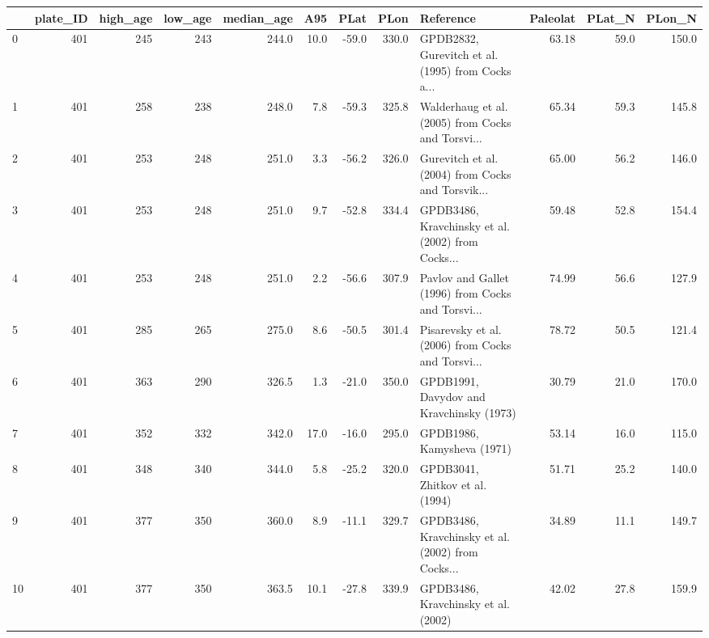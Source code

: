 \documentclass[11pt]{article}
\begin{document}
    \begin{sidewaystable}
    {\tiny\begin{tabular}{lrrrrrrrlrrr}
\toprule
{} &  plate\_ID &  high\_age &  low\_age &  median\_age &   A95 &  PLat &   PLon &                                          Reference &  Paleolat &  PLat\_N &  PLon\_N \\
\midrule
0  &       401 &       245 &      243 &       244.0 &  10.0 & -59.0 &  330.0 &  GPDB2832, Gurevitch et al. (1995) from Cocks a... &     63.18 &    59.0 &   150.0 \\
1  &       401 &       258 &      238 &       248.0 &   7.8 & -59.3 &  325.8 &  Walderhaug et al. (2005) from Cocks and Torsvi... &     65.34 &    59.3 &   145.8 \\
2  &       401 &       253 &      248 &       251.0 &   3.3 & -56.2 &  326.0 &  Gurevitch et al. (2004) from Cocks and Torsvik... &     65.00 &    56.2 &   146.0 \\
3  &       401 &       253 &      248 &       251.0 &   9.7 & -52.8 &  334.4 &  GPDB3486, Kravchinsky et al. (2002) from Cocks... &     59.48 &    52.8 &   154.4 \\
4  &       401 &       253 &      248 &       251.0 &   2.2 & -56.6 &  307.9 &  Pavlov and Gallet (1996) from Cocks and Torsvi... &     74.99 &    56.6 &   127.9 \\
5  &       401 &       285 &      265 &       275.0 &   8.6 & -50.5 &  301.4 &  Pisarevsky et al. (2006) from Cocks and Torsvi... &     78.72 &    50.5 &   121.4 \\
6  &       401 &       363 &      290 &       326.5 &   1.3 & -21.0 &  350.0 &           GPDB1991, Davydov and Kravchinsky (1973) &     30.79 &    21.0 &   170.0 \\
7  &       401 &       352 &      332 &       342.0 &  17.0 & -16.0 &  295.0 &                         GPDB1986, Kamysheva (1971) &     53.14 &    16.0 &   115.0 \\
8  &       401 &       348 &      340 &       344.0 &   5.8 & -25.2 &  320.0 &                    GPDB3041, Zhitkov et al. (1994) &     51.71 &    25.2 &   140.0 \\
9  &       401 &       377 &      350 &       360.0 &   8.9 & -11.1 &  329.7 &  GPDB3486, Kravchinsky et al. (2002) from Cocks... &     34.89 &    11.1 &   149.7 \\
10 &       401 &       377 &      350 &       363.5 &  10.1 & -27.8 &  339.9 &                GPDB3486, Kravchinsky et al. (2002) &     42.02 &    27.8 &   159.9 \\

\end{tabular}}
\end{sidewaystable}
\end{document}
